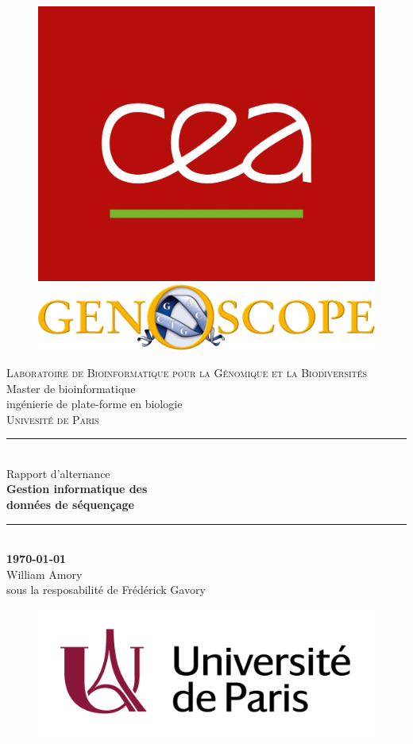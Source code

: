 \begin{titlepage}

    \newcommand{\HRule}{\rule{\linewidth}{0.5mm}} %
  
    \begin{figure}[ht!]
        \includegraphics[width=0.15\linewidth]{img/cea.jpg}
        \hspace{6cm}
        \includegraphics[width=0.5\linewidth]{img/genoscope_logo.png}
    \end{figure}
    \vspace{1cm}
  
    \begin{center}
  
        \textsc{\LARGE Laboratoire de Bioinformatique pour la Génomique et la Biodiversités}\\[1cm]
        \Large{ Master de bioinformatique \\ ingénierie de plate-forme en biologie \\ \textsc{Univesité de Paris}}\\[0.2cm]
  
  
        \vspace{1cm}
        \HRule \\[0.4cm]
        {\huge Rapport d'alternance}\\[0.4cm]
        {\Huge \bfseries Gestion informatique des \\ données de séquençage}\\
        \HRule \\[1cm]

        \LARGE{\textbf{\today}} \\[1cm]

        \LARGE{William Amory}\\[0.5cm]
        \LARGE{sous la resposabilité de Frédérick Gavory}\\[2.2cm]
    
    \end{center}
  
    \begin{figure}[ht!]
        \includegraphics[width=0.4\linewidth]{img/logo}
    \end{figure}
    \vfill %
    \newpage
  
\end{titlepage}